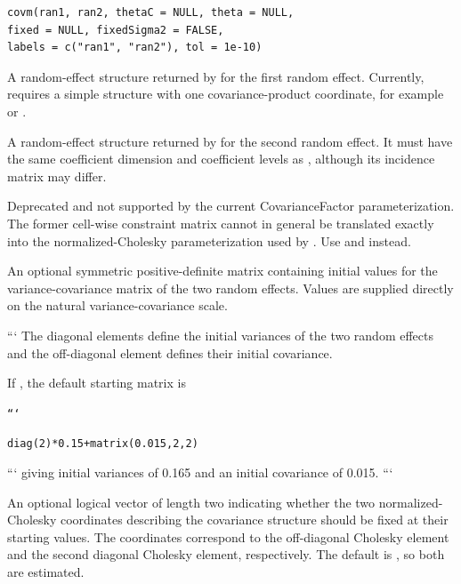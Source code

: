\documentclass[a4paper]{book}
\begin{document}
%
\begin{Usage}
\begin{verbatim}
covm(ran1, ran2, thetaC = NULL, theta = NULL,
fixed = NULL, fixedSigma2 = FALSE,
labels = c("ran1", "ran2"), tol = 1e-10)
\end{verbatim}
\end{Usage}
%
\begin{Arguments}
\begin{ldescription}

\item[\code{ran1}] 
A random-effect structure returned by  for the
first random effect. Currently,  requires a simple
 structure with one covariance-product coordinate, for
example  or
.


\item[\code{ran2}] 
A random-effect structure returned by  for the
second random effect. It must have the same coefficient dimension
and coefficient levels as , although its incidence
matrix may differ.


\item[\code{thetaC}] 
Deprecated and not supported by the current CovarianceFactor
parameterization. The former cell-wise constraint matrix cannot in
general be translated exactly into the normalized-Cholesky
parameterization used by . Use  and
 instead.


\item[\code{theta}] 
An optional symmetric  positive-definite matrix
containing initial values for the variance-covariance matrix of the
two random effects. Values are supplied directly on the natural
variance-covariance scale.

```
The diagonal elements define the initial variances of the two random
effects and the off-diagonal element defines their initial covariance.

If , the default starting matrix is

\begin{alltt}
```

diag(2) * 0.15 + matrix(0.015, 2, 2)
\end{alltt}


```
giving initial variances of 0.165 and an initial covariance of 0.015.
```



\item[\code{fixed}] 
An optional logical vector of length two indicating whether the two
normalized-Cholesky coordinates describing the covariance structure
should be fixed at their starting values. The coordinates correspond
to the off-diagonal Cholesky element and the second diagonal Cholesky
element, respectively. The default is , so both
are estimated.



\end{ldescription}
\end{Arguments}
\end{document}
